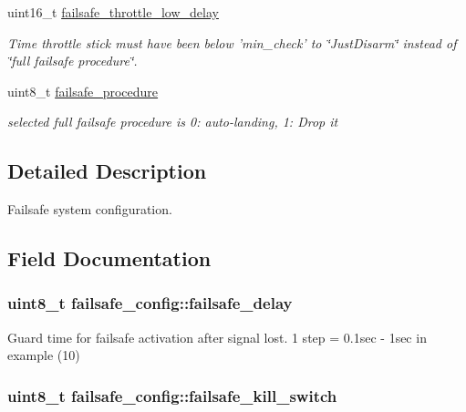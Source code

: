 \begin{DoxyCompactItemize}
uint16\+\_\+t \hyperlink{structfailsafe__config_ad263d0e9fa56496bba2520c677e39949}{failsafe\+\_\+throttle\+\_\+low\+\_\+delay}
\begin{DoxyCompactList}\small\item\em Time throttle stick must have been below 'min\+\_\+check' to \char`\"{}\+Just\+Disarm\char`\"{} instead of \char`\"{}full failsafe procedure\char`\"{}. \end{DoxyCompactList}\item 
uint8\+\_\+t \hyperlink{structfailsafe__config_add85f6d476403111b005ab1e60df1e6d}{failsafe\+\_\+procedure}
\begin{DoxyCompactList}\small\item\em selected full failsafe procedure is 0\+: auto-\/landing, 1\+: Drop it \end{DoxyCompactList}\end{DoxyCompactItemize}


\subsection{Detailed Description}
Failsafe system configuration. 

\subsection{Field Documentation}
\hypertarget{structfailsafe__config_aa73617bb85906499adcb93edcf820815}{
\subsubsection[{failsafe\+\_\+delay}]{\setlength{\rightskip}{0pt plus 5cm}uint8\+\_\+t failsafe\+\_\+config\+::failsafe\+\_\+delay}}\label{structfailsafe__config_aa73617bb85906499adcb93edcf820815}


Guard time for failsafe activation after signal lost. 1 step = 0.\+1sec -\/ 1sec in example (10) 

\hypertarget{structfailsafe__config_a01e9c5d32a5c3c42d1702ddcd0775d41}{
\subsubsection[{failsafe\+\_\+kill\+\_\+switch}]{\setlength{\rightskip}{0pt plus 5cm}uint8\+\_\+t failsafe\+\_\+config\+::failsafe\+\_\+kill\+\_\+switch}}\label{structfailsafe__config_a01e9c5d32a5c3c42d1702ddcd0775d41}


